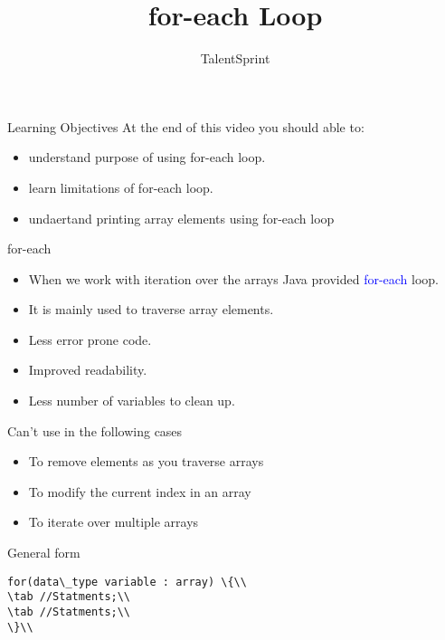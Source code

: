 \documentclass[aspectratio=169,14pt,usenames,dvipsnames]{beamer}
\title[for-each Loop]{for-each Loop}
\newcommand\tab[1][1cm]{\hspace*{#1}}
\begin{document}
{\1
\begin{frame} \vspace{35pt}

\subtitle{TalentSprint}
\maketitle
\end{frame}
}

\begin{frame}{Learning Objectives}
At the end of this video you should able to:
\begin{itemize}
\item understand purpose of using for-each loop.
\item learn limitations of for-each loop.
\item undaertand printing array elements using for-each
loop
\end{itemize}
\end{frame}

\begin{frame}{for-each}
\begin{itemize}
\item When we work with iteration over the arrays Java
provided \textcolor{blue}{for-each} loop.
\item It is mainly used to traverse array elements.
\item Less error prone code.
\item Improved readability.
\item Less number of variables to clean up.
\end{itemize}
\end{frame}



\begin{frame}{Can’t use in the following cases}

\begin{itemize}
    \item To remove elements as you traverse arrays
    \item To modify the current index in an array
    \item To iterate over multiple arrays
\end{itemize}
\end{frame}

\begin{frame}{General form}
\begin{lstlisting}
for(data\_type variable : array) \{\\
\tab //Statments;\\
\tab //Statments;\\
\}\\
\end{lstlisting}
\end{frame}
\end{document}
